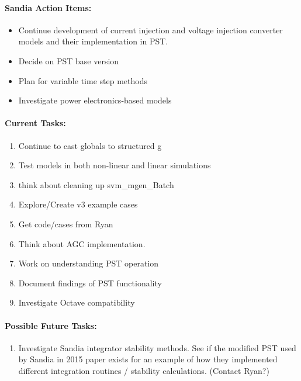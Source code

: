 \documentclass[12pt]{article}
\begin{document}
\begin{multicols}{2}
\paragraph{Sandia Action Items:}
	\begin{itemize}
		\itemsep 0em 
			\item Continue development of current injection and voltage injection converter models and their implementation in PST.
			\item Decide on PST base version
			\item Plan for variable time step methods
			\item Investigate power electronics-based models
	\end{itemize}

	
\paragraph{Current Tasks:}
	\begin{enumerate}
		\itemsep 0em 
		\item Continue to cast globals to structured g
		\item Test models in both non-linear and linear simulations
		\item think about cleaning up svm\_mgen\_Batch
		\item Explore/Create v3 example cases
		\item Get code/cases from Ryan
		\item Think about AGC implementation.
		\item Work on understanding PST operation
		\item Document findings of PST functionality
		\item Investigate Octave compatibility
\end{enumerate}

\vfill\null
\columnbreak

\paragraph{Possible Future Tasks:} %
	\begin{enumerate}
		\item Investigate Sandia integrator stability methods.	
		See if the modified PST used by Sandia in 2015 paper exists for an example of how they implemented different integration routines / stability calculations.	(Contact Ryan?)
	\end{enumerate}



\end{multicols}
\end{document}
